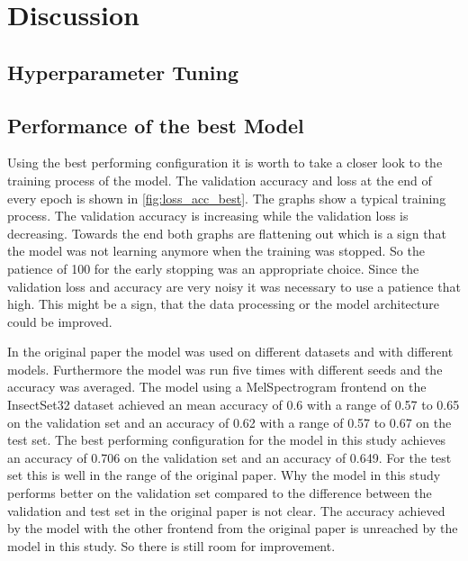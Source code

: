 


\section{Discussion}
\label{discussion}

\subsection{Hyperparameter Tuning}%



\subsection{Performance of the best Model}%

Using the best performing configuration it is worth to take a closer look to the
training process of the model. The validation accuracy and loss at the end of
every epoch is shown in \autoref{fig:loss_acc_best}. The graphs show a typical
training process. The validation accuracy is increasing while the validation loss
is decreasing. Towards the end both graphs are flattening out which is a sign that
the model was not learning anymore when the training was stopped. So the patience
of 100 for the early stopping was an appropriate choice. Since the validation loss
and accuracy are very noisy it was necessary to use a patience that high. This might
be a sign, that the data processing or the model architecture could be improved.



In the original paper \autocite{faissAdaptiveRepresentationsSound2023}
the model was used on different datasets and with different models. Furthermore the model was
run five times with different seeds and the accuracy was averaged. The model using a MelSpectrogram
frontend on the InsectSet32 dataset achieved an mean accuracy of 0.6 with a range of 0.57 to 0.65
on the validation set and an accuracy of 0.62 with a range of 0.57 to 0.67 on the test set.
The best performing configuration for the model in this study achieves an accuracy of 0.706 on the validation set
and an accuracy of 0.649. For the test set this is well in the range of the original paper.
Why the model in this study performs better on the validation set compared to the difference
between the validation and test set in the original paper is not clear. The accuracy achieved
by the model with the other frontend from the original paper is unreached by the model in this study.
So there is still room for improvement.


